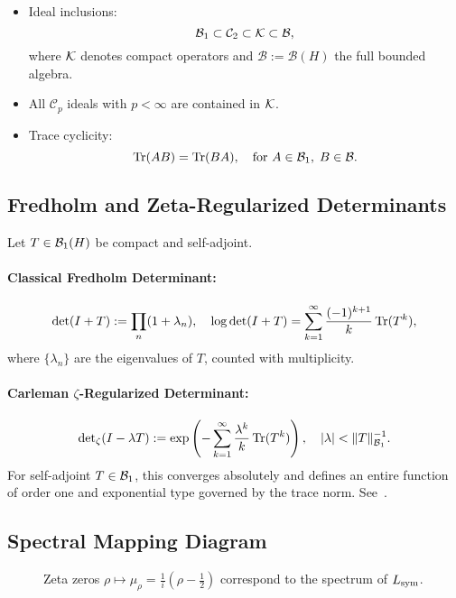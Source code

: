 \begin{itemize}
  \item Ideal inclusions:
  \[
  \mathcal{B}_1 \subset \mathcal{C}_2 \subset \mathcal{K} \subset \mathcal{B},
  \]
  where \( \mathcal{K} \) denotes compact operators and \( \mathcal{B} := \mathcal{B}(H) \) the full bounded algebra.

  \item All \( \mathcal{C}_p \) ideals with \( p < \infty \) are contained in \( \mathcal{K} \).

  \item Trace cyclicity:
  \[
  \operatorname{Tr}(AB) = \operatorname{Tr}(BA), \quad \text{for } A \in \mathcal{B}_1, \; B \in \mathcal{B}.
  \]
\end{itemize}

\subsection*{Fredholm and Zeta-Regularized Determinants}

Let \( T \in \mathcal{B}_1(H) \) be compact and self-adjoint.

\paragraph{Classical Fredholm Determinant:}
\[
\det(I + T) := \prod_n (1 + \lambda_n), \quad
\log \det(I + T) = \sum_{k=1}^\infty \frac{(-1)^{k+1}}{k} \operatorname{Tr}(T^k),
\]
where \( \{\lambda_n\} \) are the eigenvalues of \( T \), counted with multiplicity.

\paragraph{Carleman \(\zeta\)-Regularized Determinant:}
\[
\det\nolimits_\zeta(I - \lambda T) := \exp\left( -\sum_{k=1}^\infty \frac{\lambda^k}{k} \operatorname{Tr}(T^k) \right), \quad |\lambda| < \|T\|_{\mathcal{B}_1}^{-1}.
\]
For self-adjoint \( T \in \mathcal{B}_1 \), this converges absolutely and defines an entire function of order one and exponential type governed by the trace norm. See~\cite[Ch.~4]{Simon2005TraceIdeals}.

\subsection*{Spectral Mapping Diagram}

\begin{figure}[ht]
\centering
\caption{Zeta zeros \( \rho \mapsto \mu_\rho = \tfrac{1}{i}(\rho - \tfrac{1}{2}) \) correspond to the spectrum of \( L_{\mathrm{sym}} \).}
\label{fig:spectral-mapping}
\end{figure}


